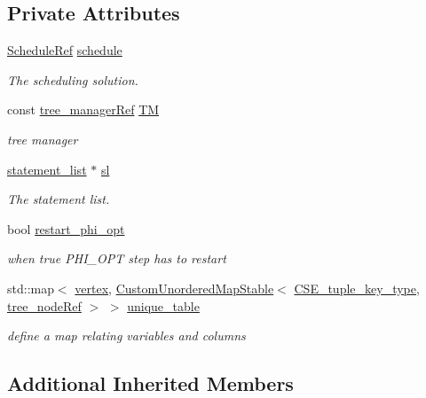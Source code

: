 \subsection*{Private Attributes}
\begin{DoxyCompactItemize}
\item 
\hyperlink{schedule_8hpp_af67f402958b3b52a1ec5cc4ce08ae3b9}{Schedule\+Ref} \hyperlink{classCSE_a71e05ccfa2a25a5c2d8d87f19d5fc2b5}{schedule}
\begin{DoxyCompactList}\small\item\em The scheduling solution. \end{DoxyCompactList}\item 
const \hyperlink{tree__manager_8hpp_a96ff150c071ce11a9a7a1e40590f205e}{tree\+\_\+manager\+Ref} \hyperlink{classCSE_a07193f5f92e5a2c8eebb6d459cf192c1}{TM}
\begin{DoxyCompactList}\small\item\em tree manager \end{DoxyCompactList}\item 
\hyperlink{structstatement__list}{statement\+\_\+list} $\ast$ \hyperlink{classCSE_a0548b738f81f709d2c781cac84c3dd7f}{sl}
\begin{DoxyCompactList}\small\item\em The statement list. \end{DoxyCompactList}\item 
bool \hyperlink{classCSE_aa626fd33f0c12bb38a156f1911131fc6}{restart\+\_\+phi\+\_\+opt}
\begin{DoxyCompactList}\small\item\em when true P\+H\+I\+\_\+\+O\+PT step has to restart \end{DoxyCompactList}\item 
std\+::map$<$ \hyperlink{graph_8hpp_abefdcf0544e601805af44eca032cca14}{vertex}, \hyperlink{custom__map_8hpp_a7314a7df1cdb3a3acf478ab86e95c226}{Custom\+Unordered\+Map\+Stable}$<$ \hyperlink{classCSE_a541f4bbb7540d84d1ed98f9c44b74417}{C\+S\+E\+\_\+tuple\+\_\+key\+\_\+type}, \hyperlink{tree__node_8hpp_a6ee377554d1c4871ad66a337eaa67fd5}{tree\+\_\+node\+Ref} $>$ $>$ \hyperlink{classCSE_a4188552ee310686996e4d3cacf837125}{unique\+\_\+table}
\begin{DoxyCompactList}\small\item\em define a map relating variables and columns \end{DoxyCompactList}\end{DoxyCompactItemize}
\subsection*{Additional Inherited Members}



